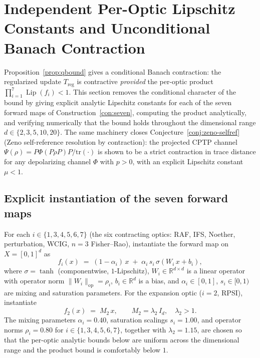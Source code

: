 \documentclass[11pt,a4paper]{article}
\theoremstyle{plain}
\theoremstyle{definition}
\theoremstyle{remark}
\newcommand{\RR}{\mathbb{R}}
\DeclareMathOperator{\Lip}{Lip}
\begin{document}
\section{Independent Per-Optic Lipschitz Constants and Unconditional Banach Contraction}\label{sec:lipschitz}

Proposition~\ref{prop:qbound} gives a conditional Banach contraction:
the regularized update $T_{\mathrm{reg}}$ is contractive \emph{provided}
the per-optic product $\prod_{i=1}^{7}\Lip(f_{i})<1$. This section
removes the conditional character of the bound by giving explicit
analytic Lipschitz constants for each of the seven forward maps of
Construction~\ref{con:seven}, computing the product analytically, and
verifying numerically that the bound holds throughout the dimensional
range $d\in\{2,3,5,10,20\}$. The same machinery closes
Conjecture~\ref{conj:zeno-selfref} (Zeno self-reference resolution by
contraction): the projected CPTP channel
$\Psi(\rho)=P\Phi(P\rho P)P/\mathrm{tr}(\cdot)$ is shown to be a strict
contraction in trace distance for any depolarizing channel $\Phi$ with
$p>0$, with an explicit Lipschitz constant $\mu<1$.

\subsection{Explicit instantiation of the seven forward maps}

For each $i\in\{1,3,4,5,6,7\}$ (the six contracting optics: RAF, IFS,
Noether, perturbation, WCIG, $n=3$ Fisher--Rao), instantiate the
forward map on $X=[0,1]^{d}$ as
\begin{equation}\label{eq:fi-contracting}
  f_{i}(x) \;=\; (1-\alpha_{i})\,x \;+\; \alpha_{i}\,s_{i}\,\sigma(W_{i}\,x+b_{i}),
\end{equation}
where $\sigma=\tanh$ (componentwise, $1$-Lipschitz), $W_{i}\in\RR^{d\times
d}$ is a linear operator with operator norm $\|W_{i}\|_{\mathrm{op}}=\rho_{i}$,
$b_{i}\in\RR^{d}$ is a bias, and $\alpha_{i}\in[0,1]$, $s_{i}\in[0,1)$
are mixing and saturation parameters. For the expansion optic
($i=2$, RPSI), instantiate
\begin{equation}\label{eq:f2-expansion}
  f_{2}(x) \;=\; M_{2}\,x,\qquad M_{2}=\lambda_{2}\,I_{d},\quad \lambda_{2}>1.
\end{equation}
The mixing parameters $\alpha_{i}=0.40$, saturation scalings
$s_{i}=1.00$, and operator norms $\rho_{i}=0.80$ for $i\in
\{1,3,4,5,6,7\}$, together with $\lambda_{2}=1.15$, are chosen so
that the per-optic analytic bounds below are uniform across the
dimensional range and the product bound is comfortably below $1$.
\end{document}
